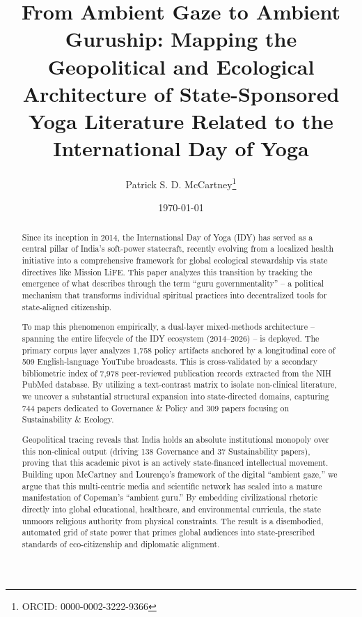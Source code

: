 \documentclass[11pt]{article}
\title{From Ambient Gaze to Ambient Guruship: Mapping the Geopolitical and Ecological Architecture of State-Sponsored Yoga Literature Related to the International Day of Yoga}
\author[1]{Patrick S. D. McCartney\thanks{ORCID: 0000-0002-3222-9366}}
\affil[1]{Nanzan University Anthropological Institute, Nagoya, Japan}
\affil[2]{Australian National University, Canberra, Australia}
\affil[3]{Manipal Academy of Higher Education, Manipal, India}
\date{\today}
\begin{document}
\maketitle




\begin{abstract}
Since its inception in 2014, the International Day of Yoga (IDY) has served as a central pillar of India's soft-power statecraft, recently evolving from a localized health initiative into a comprehensive framework for global ecological stewardship via state directives like Mission LiFE. This paper analyzes this transition by tracking the emergence of what \cite{copeman2012} describes through the term ``guru governmentality'' -- a political mechanism that transforms individual spiritual practices into decentralized tools for state-aligned citizenship. 

To map this phenomenon empirically, a dual-layer mixed-methods architecture – spanning the entire lifecycle of the IDY ecosystem (2014–2026) – is deployed. The primary corpus layer analyzes 1,758 policy artifacts anchored by a longitudinal core of 509 English-language YouTube broadcasts. This is cross-validated by a secondary bibliometric index of 7,978 peer-reviewed publication records extracted from the NIH PubMed database. By utilizing a text-contrast matrix to isolate non-clinical literature, we uncover a substantial structural expansion into state-directed domains, capturing 744 papers dedicated to Governance \& Policy and 309 papers focusing on Sustainability \& Ecology. 

Geopolitical tracing reveals that India holds an absolute institutional monopoly over this non-clinical output (driving 138 Governance and 37 Sustainability papers), proving that this academic pivot is an actively state-financed intellectual movement. Building upon McCartney and Louren\c{c}o's framework of the digital ``ambient gaze,'' we argue that this multi-centric media and scientific network has scaled into a mature manifestation of Copeman's ``ambient guru.'' By embedding civilizational rhetoric directly into global educational, healthcare, and environmental curricula, the state unmoors religious authority from physical constraints. The result is a disembodied, automated grid of state power that primes global audiences into state-prescribed standards of eco-citizenship and diplomatic alignment.


\end{abstract}
\end{document}
